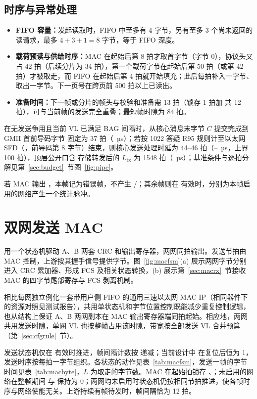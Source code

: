 \subsection{时序与异常处理}
\begin{itemize}
  \item \textbf{FIFO 容量：}发起读取时，FIFO 中至多有 4 字节，另有至多 3 个尚未返回的读请求，最多 $4+3+1=8$ 字节，等于 FIFO 深度。
  \item \textbf{载荷预读与供给时序：}MAC 在起始后第 8 拍才取首字节（字节 0），协议头又占 42 拍（后续分片为 34 拍），第一个载荷字节在起始后第 50 拍（或第 42 拍）才被取走，而 FIFO 在起始后第 4 拍就开始填充；此后每拍补入一字节、取出一字节。下一页号在跨页前 500 拍以上已读出。
  \item \textbf{准备时间：}下一帧或分片的帧头与校验和准备需 13 拍（锁存 1 拍加  共 12 拍），可与当前帧的发送完全重叠；最短帧时隙为 84 拍。
\end{itemize}
在无发送争用且当前 VL 已满足 BAG 间隔时，从核心消息末字节 $C$ 提交完成到 GMII 首前导码字节  固定为 37 拍（\TtxSof~µs）；若按 1022 答疑 R95 规则计至以太网 SFD（，前导码第 8 字节）结束，则核心发送处理时延为 44--46 拍（\TtxCore--\TtxCoreMax~µs，上界 100 拍），顶层公开口含  存储转发后的 $L_\text{tx}$ 为 1548 拍（\Ttx~µs）；基准条件与逐拍分解见第~\ref{sec:budget}~节图~\ref{fig:pipe}。

若 MAC 输出 ，本帧记为错误帧，不产生 /；其余帧则在  有效时，分别为本帧启用的网络产生一个统计脉冲。

\section{双网发送 MAC}\label{sec:mactx}

 用一个状态机驱动 A、B 两套 CRC 和输出寄存器，两网同拍输出。发送节拍由 MAC 控制，上游按其握手信号提供字节。图~\ref{fig:macfsm}(a) 展示两网字节分别进入 CRC 累加器、形成 FCS 及相关状态转换，(b) 展示第~\ref{sec:macrx}~节接收 MAC 的四字节尾部寄存与 FCS 剥离机制。

相比每网独立例化一套带用户侧 FIFO 的通用三速以太网 MAC IP（相同器件下的资源对照见测试报告），共用单状态机和字节位置控制既能减少重复控制逻辑，也从结构上保证 A、B 两网副本在 MAC 输出寄存器端同拍起始。相应地，两网共用发送时隙，单网 VL 也按整帧占用该时隙，带宽按全部发送 VL 合并预算（第~\ref{sec:cfgrule}~节）。

发送状态机仅在  有效时推进，帧间隔计数按  递减；当前设计中  在复位后恒为 1，发送时序按每拍一字节组织。各状态的动作见表~\ref{tab:macfsm}，发送一帧的字节时间见表~\ref{tab:macbyte}，$L$ 为取走的字节数。MAC 在起始拍锁存 、；未启用的网络在整帧期间  与  保持为 0；两网均未启用时状态机仍按相同节拍推进，使各帧时序与网络使能无关。上游持续有帧待发时，帧间隔恰为 12 拍。


